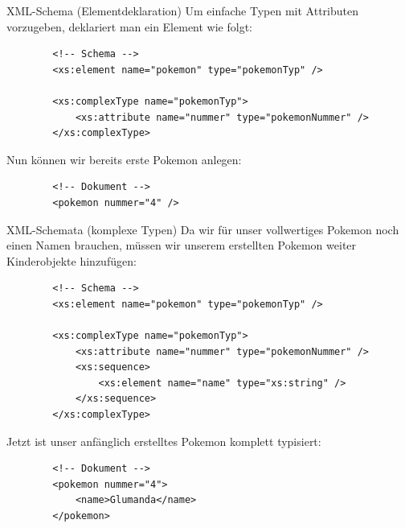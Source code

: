 \begin{example}{XML-Schema (Elementdeklaration)}
    Um einfache Typen mit Attributen vorzugeben, deklariert man ein Element wie folgt:

    \begin{lstlisting}
        <!-- Schema -->
        <xs:element name="pokemon" type="pokemonTyp" />

        <xs:complexType name="pokemonTyp">
            <xs:attribute name="nummer" type="pokemonNummer" />
        </xs:complexType>
    \end{lstlisting}

    Nun können wir bereits erste Pokemon anlegen:

    \begin{lstlisting}
        <!-- Dokument -->
        <pokemon nummer="4" />
    \end{lstlisting}
\end{example}

\begin{example}{XML-Schemata (komplexe Typen)}
    Da wir für unser vollwertiges Pokemon noch einen Namen brauchen, müssen wir unserem erstellten Pokemon weiter Kinderobjekte hinzufügen:

    \begin{lstlisting}
        <!-- Schema -->
        <xs:element name="pokemon" type="pokemonTyp" />

        <xs:complexType name="pokemonTyp">
            <xs:attribute name="nummer" type="pokemonNummer" />
            <xs:sequence>
                <xs:element name="name" type="xs:string" />
            </xs:sequence>
        </xs:complexType>
    \end{lstlisting}

    Jetzt ist unser anfänglich erstelltes Pokemon komplett typisiert:

    \begin{lstlisting}
        <!-- Dokument -->
        <pokemon nummer="4">
            <name>Glumanda</name>
        </pokemon>
    \end{lstlisting}
\end{example}

